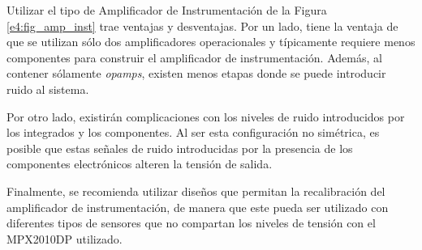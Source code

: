 Utilizar el tipo de Amplificador de Instrumentación de la Figura \ref{e4:fig_amp_inst} trae ventajas y desventajas. Por un lado, tiene la ventaja de que se utilizan sólo dos amplificadores operacionales y típicamente requiere menos componentes para construir el amplificador de instrumentación. Además, al contener sólamente \textit{opamps}, existen menos etapas donde se puede introducir ruido al sistema.

Por otro lado, existirán complicaciones con los niveles de ruido introducidos por los integrados y los componentes. Al ser esta configuración no simétrica, es posible que estas señales de ruido introducidas por la presencia de los componentes electrónicos alteren la tensión de salida.

Finalmente, se recomienda utilizar diseños que permitan la recalibración del amplificador de instrumentación, de manera que este pueda ser utilizado con diferentes tipos de sensores que no compartan los niveles de tensión con el MPX2010DP utilizado.